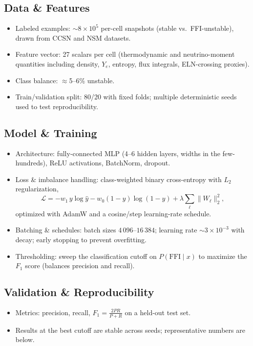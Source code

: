 \documentclass[10pt]{article}
\begin{document}
\begin{center}
\subsection*{Data \& Features}
\begin{itemize}
  \item Labeled examples: $\sim 8\times 10^5$ per-cell snapshots (stable vs.\ FFI-unstable), drawn from CCSN and NSM datasets.
  \item Feature vector: 27 scalars per cell (thermodynamic and neutrino-moment quantities including density, $Y_e$, entropy, flux integrals, ELN-crossing proxies).
  \item Class balance: $\approx$5--6\% unstable.
  \item Train/validation split: 80/20 with fixed folds; multiple deterministic seeds used to test reproducibility.
\end{itemize}

\subsection*{Model \& Training}
\begin{itemize}
  \item Architecture: fully-connected MLP (4--6 hidden layers, widths in the few-hundreds), ReLU activations, BatchNorm, dropout.
  \item Loss \& imbalance handling: class-weighted binary cross-entropy with $L_2$ regularization,
  \begin{equation*}
  \mathcal{L} = -w_1\, y\log \hat y - w_0 (1-y)\log(1-\hat y) + \lambda \sum_{\ell}\lVert W_\ell\rVert_2^2,
  \end{equation*}
  optimized with AdamW and a cosine/step learning-rate schedule.
  \item Batching \& schedules: batch sizes $4\,096$--$16\,384$; learning rate $\sim 3\times 10^{-3}$ with decay; early stopping to prevent overfitting.
  \item Thresholding: sweep the classification cutoff on $P(\mathrm{FFI}\mid x)$ to maximize the $F_1$ score (balances precision and recall).
\end{itemize}

\subsection*{Validation \& Reproducibility}
\begin{itemize}
  \item Metrics: precision, recall, $F_1 = \frac{2PR}{P+R}$ on a held-out test set.
  \item Results at the best cutoff are stable across seeds; representative numbers are below.
\end{itemize}


\end{center}
\end{document}
